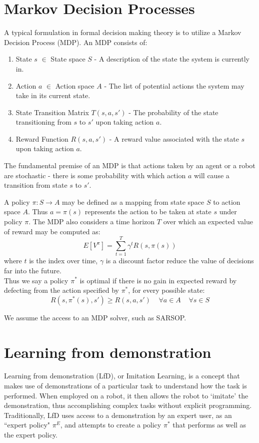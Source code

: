 \section{Markov Decision Processes}
A typical formulation in formal decision making theory is to utilize a Markov Decision Process (MDP). An MDP consists of: 
\begin{enumerate}
	\item State $s$ $\in$ State space $S$ - A description of the state the system is currently in. 
	\item Action $a$ $\in$ Action space $A$ - The list of potential actions the system may take in its current state.
	\item State Transition Matrix $T(s,a,s')$ - The probability of the state transitioning from $s$ to $s'$ upon taking action $a$. 
	\item Reward Function $R(s,a,s')$ - A reward value associated with the state $s$ upon taking action $a$. 
\end{enumerate}
The fundamental premise of an MDP is that actions taken by an agent or a robot are stochastic - there is some probability with which action $a$ will cause a transition from state $s$ to $s'$. 

A policy $\pi: S \rightarrow A $ may be defined as a mapping from state space $S$ to action space $A$. Thus $a=\pi(s)$ represents the action to be taken at state $s$ under policy $\pi$. The MDP also considers a time horizon $T$ over which an expected value of reward may be computed as: 
\begin{equation}
E[V^\pi] = \sum_{t=1}^{T} \gamma^t R(s,\pi(s))
\end{equation}
where $t$ is the index over time, $\gamma$ is a discount factor reduce the value of decisions far into the future. \\

Thus we say a policy $\pi^*$ is optimal if there is no gain in expected reward by defecting from the action specified by $\pi^*$, for every possible state: 
\begin{equation}
R(s,\pi^*(s),s') \geq R(s,a,s') \;\;\;\; \forall a \in A \;\;\;\; \forall s \in S
\end{equation}

We assume the access to an MDP solver, such as SARSOP. 

\section{Learning from demonstration}
Learning from demonstration (LfD), or Imitation Learning, is a concept that makes use of demonstrations of a particular task to understand how the task is performed. When employed on a robot, it then allows the robot to `imitate' the demonstration, thus accomplishing complex tasks without explicit programming. Traditionally, LfD uses access to a demonstration by an expert user, as an ``expert policy" $\pi^E$, and attempts to create a policy $\pi^*$ that performs as well as the expert policy.

